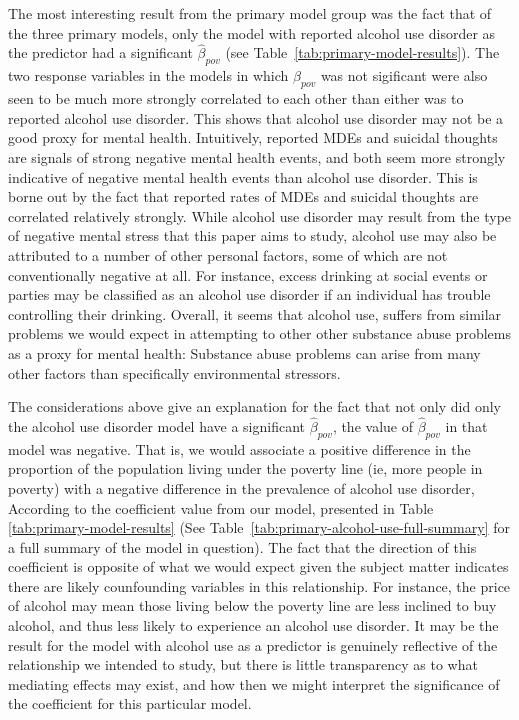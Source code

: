 \documentclass{article}
\begin{document}
The most interesting result from the primary model group
was the fact that of the three primary models,
only the model with reported alcohol use disorder
as the predictor had a significant $\hat{\beta}_{pov}$
(see Table~\ref{tab:primary-model-results}).
The two response variables in the models in which
$\hat{\beta}_{pov}$ was not sigificant were also
seen to be much more strongly correlated to each other
than either was to reported alcohol use disorder.
This shows that alcohol use disorder may not
be a good proxy for mental health.
Intuitively, reported MDEs and suicidal thoughts
are signals of strong negative mental health events,
and both seem more strongly indicative of negative mental health events
than alcohol use disorder.
This is borne out by the fact that
reported rates of MDEs and suicidal thoughts
are correlated relatively strongly.
While alcohol use disorder may result from the type of negative
mental stress that this paper aims to study,
alcohol use may also be attributed to a number
of other personal factors, some of which are not conventionally
negative at all.
For instance, excess drinking at social events or parties
may be classified as an alcohol use disorder if
an individual has trouble controlling their drinking.
Overall, it seems that alcohol use,
suffers from similar problems we would expect in attempting
to other other substance abuse problems
as a proxy for mental health:
Substance abuse problems can arise from many other
factors than specifically environmental stressors.

The considerations above give an explanation for the fact that
not only did only the alcohol use disorder model have a
significant $\hat{\beta}_{pov}$, the value of $\hat{\beta}_{pov}$
in that model was negative.
That is, we would associate a positive difference in
the proportion of the population living under the poverty line
(ie, more people in poverty)
with a negative difference in the prevalence of alcohol use disorder,
According to the coefficient value from our model, presented in
Table \ref{tab:primary-model-results}
(See Table~\ref{tab:primary-alcohol-use-full-summary} for a full
summary of the model in question).
The fact that the direction of this coefficient is opposite of
what we would expect given the subject matter
indicates there are likely counfounding variables in this relationship.
For instance, the price of alcohol may mean those living below
the poverty line are less inclined to buy alcohol,
and thus less likely to experience an alcohol use disorder.
It may be the result for the model with alcohol use as
a predictor is genuinely reflective of the relationship
we intended to study, but there is little transparency
as to what mediating effects may exist,
and how then we might interpret the significance of
the coefficient for this particular model.
\end{document}

